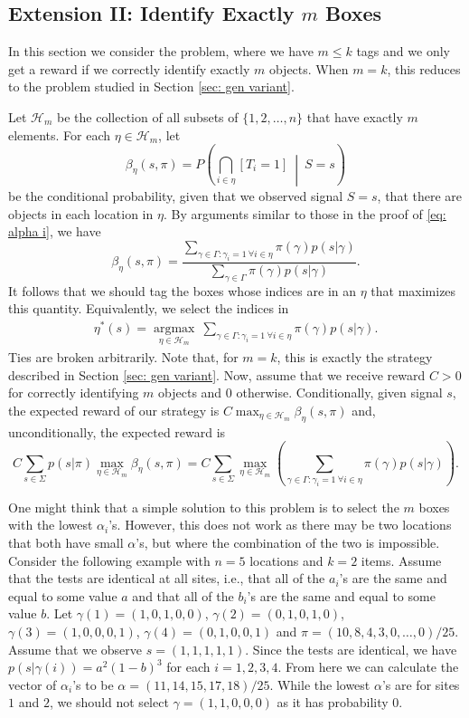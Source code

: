 \documentclass[a4paper,11pt]{article}
\begin{document}
\subsection{Extension II: Identify Exactly $m$ Boxes}\label{sec: gen variant gen}

In this section we consider the  problem, where we have $m\le k$ tags and we only get a reward if we correctly identify exactly $m$ objects. When $m=k$, this reduces to the problem studied in Section \ref{sec: gen variant}. 

Let $\mathcal H_m$ be the collection of all subsets of $\{1,2,\dots,n\}$ that have exactly $m$ elements. For each $\eta\in\mathcal H_m$, let
$$
\beta_\eta(s,\pi) = P\left(\bigcap_{i\in\eta}\left[T_i=1\right]\ \middle|\ S=s\right)
$$
be the conditional probability, given that we observed signal $S=s$, that there are objects in each location in $\eta$. By arguments similar to those in the proof of \eqref{eq: alpha i}, we have
$$
\beta_\eta(s,\pi) = \frac{\sum\limits_{\gamma\in\Gamma: \gamma_i=1\ \forall i\in\eta} \pi(\gamma)p(s|\gamma)}{\sum_{\gamma\in \Gamma}\pi(\gamma)p(s|\gamma)}.
$$
It follows that we should tag the boxes whose indices are in an $\eta$ that maximizes this quantity. Equivalently, we select the indices in
\begin{eqnarray}\label{eq:eta star}
\eta^*(s) = \underset{\eta\in\mathcal H_m}{\operatorname{argmax}}\  \sum\limits_{\gamma\in\Gamma: \gamma_i=1\ \forall i\in\eta} \pi(\gamma)p(s|\gamma).
\end{eqnarray}
Ties are broken arbitrarily. Note that, for $m=k$, this is exactly the strategy described in Section \ref{sec: gen variant}. Now, assume that we receive reward $C>0$ for correctly identifying $m$ objects and $0$ otherwise. Conditionally, given signal $s$, the expected reward of our strategy is $C \max_{\eta\in\mathcal H_m}  \beta_\eta(s,\pi)$ and, unconditionally, the expected reward is
$$
C \sum_{s\in\Sigma} p(s|\pi) \max_{\eta\in\mathcal H_m} \beta_\eta(s,\pi)  = C \sum_{s\in\Sigma}  \max_{\eta\in\mathcal H_m} \left( \sum\limits_{\gamma\in\Gamma: \gamma_i=1\ \forall i\in\eta} \pi(\gamma)p(s|\gamma) \right).
$$

One might think that a simple solution to this problem is to select the $m$ boxes with the lowest $\alpha_i$'s. However, this does not work as there may be two locations that both have small $\alpha$'s, but where the combination of the two is impossible. Consider the following example with $n=5$ locations and $k=2$ items. Assume that the tests are identical at all sites, i.e., that all of the $a_i$'s are the same and equal to some value $a$ and that all of the $b_i$'s are the same and equal to some value $b$. 
Let $\gamma(1)=(1,0,1,0,0)$,  $\gamma(2)=(0,1,0,1,0)$,  $\gamma(3)=(1,0, 0,0,1)$, $\gamma(4)=(0,1,0,0,1)$ and $\pi=(10,8,4,3,0,\dots,0)/25$. Assume that we observe $s=(1,1,1,1,1)$. Since the tests are identical, we have $p(s|\gamma(i))=a^2(1-b)^3$ for each $i=1,2,3,4$. From here we can calculate the vector of $\alpha_i$'s to be $\alpha= (11,14,15,17,18)/25$. While the lowest $\alpha$'s are for sites $1$ and $2$, we should not select $\gamma=(1,1,0,0,0)$ as it has probability $0$. 
\end{document}
